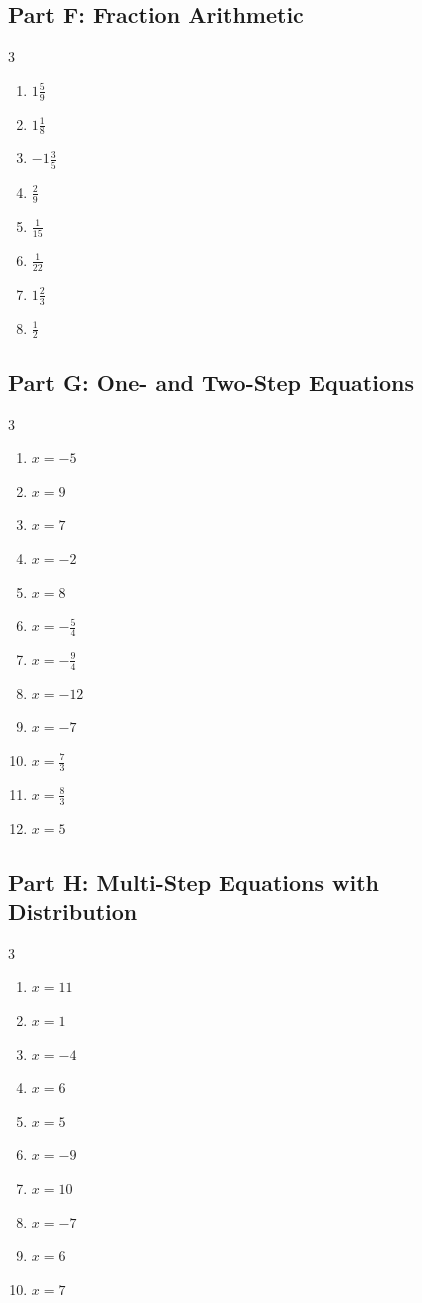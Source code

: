 \documentclass[11pt]{article}
\begin{document}
\subsection*{Part F: Fraction Arithmetic}
\begin{multicols}{3}
\begin{enumerate}
  \item $1\frac{5}{9}$
  \item $1\frac{1}{8}$
  \item $-1\frac{3}{5}$
  \item $\frac{2}{9}$
  \item $\frac{1}{15}$
  \item $\frac{1}{22}$
  \item $1\frac{2}{3}$
  \item $\frac{1}{2}$
\end{enumerate}
\end{multicols}
\subsection*{Part G: One- and Two-Step Equations}
\begin{multicols}{3}
\begin{enumerate}
  \item $x = -5$
  \item $x = 9$
  \item $x = 7$
  \item $x = -2$
  \item $x = 8$
  \item $x = - \frac{5}{4}$
  \item $x = - \frac{9}{4}$
  \item $x = -12$
  \item $x = -7$
  \item $x = \frac{7}{3}$
  \item $x = \frac{8}{3}$
  \item $x = 5$
\end{enumerate}
\end{multicols}
\subsection*{Part H: Multi-Step Equations with Distribution}
\begin{multicols}{3}
\begin{enumerate}
  \item $x = 11$
  \item $x = 1$
  \item $x = -4$
  \item $x = 6$
  \item $x = 5$
  \item $x = -9$
  \item $x = 10$
  \item $x = -7$
  \item $x = 6$
  \item $x = 7$
\end{enumerate}
\end{multicols}
\end{document}
